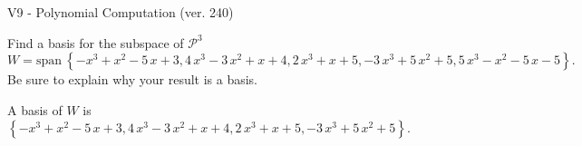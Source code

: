 \begin{exercise}
  \begin{exerciseTitle}V9 - Polynomial Computation (ver. 240)\end{exerciseTitle}
  \begin{exerciseStatement}
    Find a basis for the subspace of \(\mathcal{P}^3\) 
\[W=\mathrm{span}\ \left\{-x^{3} + x^{2} - 5 \, x + 3 , 4 \, x^{3} - 3 \, x^{2} + x + 4 , 2 \, x^{3} + x + 5 , -3 \, x^{3} + 5 \, x^{2} + 5 , 5 \, x^{3} - x^{2} - 5 \, x - 5\right\}.\]
 Be sure to explain why your result is a basis.


  \end{exerciseStatement}
  \begin{exerciseAnswer}
   A basis of \(W\) is  \(\left\{-x^{3} + x^{2} - 5 \, x + 3 , 4 \, x^{3} - 3 \, x^{2} + x + 4 , 2 \, x^{3} + x + 5 , -3 \, x^{3} + 5 \, x^{2} + 5\right\}\).
  


  \end{exerciseAnswer}
\end{exercise}